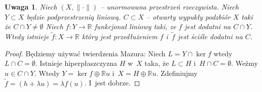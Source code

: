 \documentclass[11pt]{mwrep}
\renewcommand{\[}{\begin{equation}}
\renewcommand{\]}{\end{equation}}
\newcommand{\R}{{\ensuremath{\mathbb R}}}
\newcommand{\norm}{\|\cdot\|}
\newtheorem{uw}[subsection]{Uwaga}
\begin{document}
\begin{uw}
	Niech $(X,\norm)$ -- unormowana przestrzeń rzeczywista. Niech $Y\subset X$ będzie podprzestrzenią liniową.
	$C\subset X$ -- otwarty wypukły podzbiór $X$ taki że $C \cap Y \not = \emptyset $ Niech $f:Y\to \R$ funkcjonał liniowy taki, ze  
	$f$ jest dodatni na $C\cap Y$. Wtedy istnieje $\tilde{f} : X \to \R$ który jest przedłużeniem $f$ i~$\tilde{f}$ jest ściśle dodatni na $C$.
\end{uw}
\begin{proof}
	Będziemy używać twierdzenia Mazura: Niech $L= Y \cap \ker f$ wtedy $L\cap C = \emptyset$. 
	Istnieje hiperpłaszczyzna $H$ w~$X$ taka, że $L\subset H$ i~$H\cap C = \emptyset$.
	Weźmy $u \in C \cap Y$. Wtedy $Y = \ker f \oplus \R u$ i~$X = H\oplus \R u$.
	Zdefiniujmy $\tilde{f} = (h+\lambda u) = \lambda f(u)$. I~jest dobrze. 
\end{proof}
\end{document}
